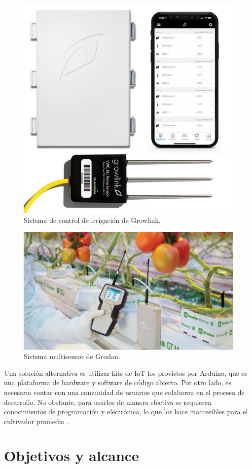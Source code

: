 \begin{figure}[htb]
\centering 
\includegraphics[width=.5\textwidth]{../Figures/growlink.jpg}
\caption[Sistema de control de irrigación de Growlink]{Sistema de control de irrigación de Growlink\protect\footnotemark.}
\label{fig:grodan}
\end{figure}


\begin{figure}[hb]
\centering 
\includegraphics[width=.5\textwidth]{../Figures/grodan.jpg}
\caption[Sistema multisensor de Grodan]{Sistema multisensor de Grodan\protect\footnotemark.}
\label{fig:growlink}
\end{figure}



Una solución alternativa es utilizar kits de IoT los provistos por Arduino\citep{arduino}, que es una plataforma de hardware y software de código abierto. Por otro lado, es necesario contar con una comunidad de usuarios que colaboren en el proceso de desarrollo. No obstante, para usarlos de manera efectiva se requieren conocimientos de programación y electrónica, lo que los hace inaccesibles para el cultivador promedio \citep{digger:1}. \\



\section{Objetivos y alcance}


